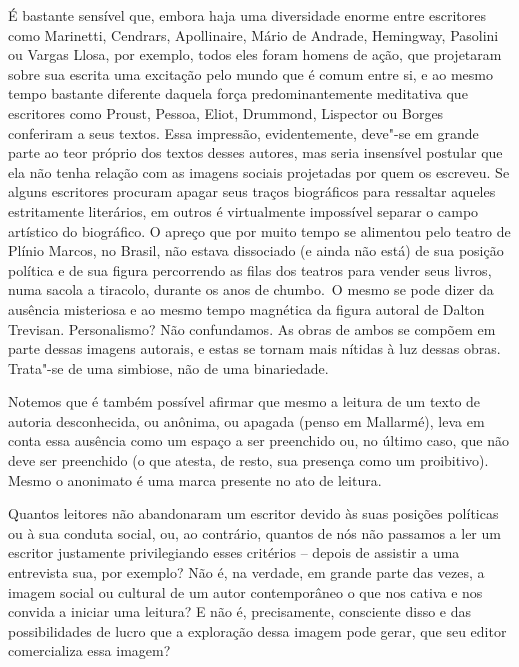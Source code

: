 É bastante sensível que, embora haja uma diversidade enorme entre
escritores como Marinetti, Cendrars, Apollinaire, Mário de Andrade, Hemingway, Pasolini ou Vargas Llosa, por exemplo, todos eles foram homens de ação, que projetaram sobre sua escrita uma excitação pelo
mundo que é comum entre si, e ao mesmo tempo bastante diferente daquela
força predominantemente meditativa que escritores como Proust, Pessoa,
Eliot, Drummond, Lispector ou Borges conferiram a seus textos. Essa impressão, evidentemente, deve"-se em grande parte ao teor próprio dos textos desses autores, mas seria insensível postular que ela não tenha
relação com as imagens sociais projetadas por quem os escreveu. Se
alguns escritores procuram apagar seus traços biográficos para ressaltar
aqueles estritamente literários, em outros é virtualmente impossível
separar o campo artístico do biográfico. O apreço que por muito tempo se
alimentou pelo teatro de Plínio Marcos, no Brasil, não estava dissociado
(e ainda não está) de sua posição política e de sua figura percorrendo
as filas dos teatros para vender seus livros, numa sacola a tiracolo,
durante os anos de chumbo.~O mesmo se pode dizer da ausência misteriosa
e ao mesmo tempo magnética da figura autoral de Dalton Trevisan.
Personalismo? Não confundamos. As obras de ambos se compõem em parte
dessas imagens autorais, e estas se tornam mais nítidas à luz dessas
obras. Trata"-se de uma simbiose, não de uma binariedade.

Notemos que é também possível afirmar que mesmo a leitura de um texto de
autoria desconhecida, ou anônima, ou apagada (penso em Mallarmé), leva
em conta essa ausência como um espaço a ser preenchido ou, no último
caso, que não deve ser preenchido (o que atesta, de resto, sua presença
como um proibitivo). Mesmo o anonimato é uma marca presente no ato de
leitura.

Quantos leitores não abandonaram um escritor devido às suas posições
políticas ou à sua conduta social, ou, ao contrário, quantos de nós não
passamos a ler um escritor justamente privilegiando esses critérios --
depois de assistir a uma entrevista sua, por exemplo? Não é, na verdade,
em grande parte das vezes, a imagem social ou cultural de um autor
contemporâneo o que nos cativa e nos convida a iniciar uma leitura? E
não é, precisamente, consciente disso e das possibilidades de lucro que
a exploração dessa imagem pode gerar, que seu editor comercializa essa
imagem?

